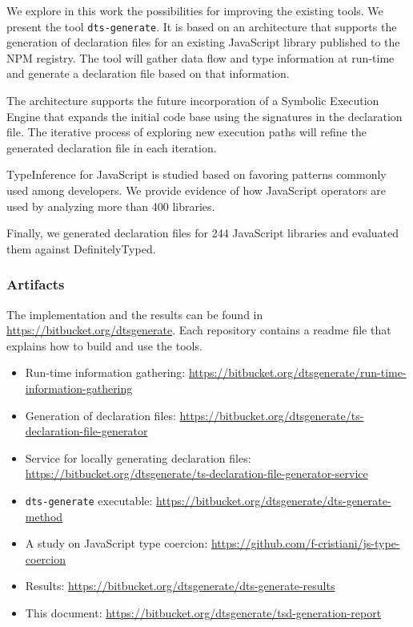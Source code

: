 We explore in this work the possibilities for improving the existing tools. We present the tool \texttt{dts-generate}. It is based on an architecture that supports the generation of declaration files for an existing JavaScript library published to the NPM registry. The tool will gather data flow and type information at run-time and generate a declaration file based on that information.

The architecture supports the future incorporation of a Symbolic Execution Engine that expands the initial code base using the signatures in the declaration file. The iterative process of exploring new execution paths will refine the generated declaration file in each iteration.

TypeInference for JavaScript is studied based on favoring patterns commonly used among developers. We provide evidence of how JavaScript operators are used by analyzing more than 400 libraries.

Finally, we generated declaration files for 244 JavaScript libraries and evaluated them against DefinitelyTyped.

\subsubsection{Artifacts}
The implementation and the results can be found in \url{https://bitbucket.org/dtsgenerate}. Each repository contains a readme file that explains how to build and use the tools.

\begin{itemize}
	\item Run-time information gathering: \url{https://bitbucket.org/dtsgenerate/run-time-information-gathering}
	\item Generation of declaration files: \url{https://bitbucket.org/dtsgenerate/ts-declaration-file-generator}
	\item Service for locally generating declaration files: \url{https://bitbucket.org/dtsgenerate/ts-declaration-file-generator-service}
	\item \texttt{dts-generate} executable: \url{https://bitbucket.org/dtsgenerate/dts-generate-method}
	\item A study on JavaScript type coercion: \url{https://github.com/f-cristiani/js-type-coercion}
	\item Results: \url{https://bitbucket.org/dtsgenerate/dts-generate-results}
	\item This document: \url{https://bitbucket.org/dtsgenerate/tsd-generation-report}
\end{itemize}